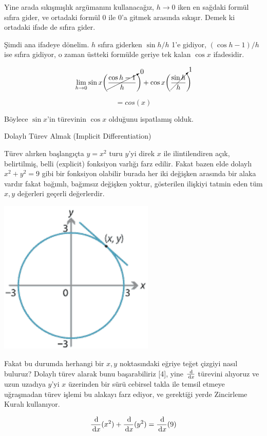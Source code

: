 \documentclass[12pt,fleqn]{article}\usepackage{../../common}
\begin{document}
Yine arada sıkışmışlık argümanını kullanacağız, $h \to 0$ iken en sağdaki
formül sıfıra gider, ve ortadaki formül 0 ile 0'a gitmek arasında
sıkışır. Demek ki ortadaki ifade de sıfıra gider.

Şimdi ana ifadeye dönelim. $h$ sıfıra giderken $\sin h/h$ 1'e gidiyor,
$(\cos h-1)/h$ ise sıfıra gidiyor, o zaman üstteki formülde geriye tek
kalan $\cos x$ ifadesidir. 

$$ \lim_{h \to 0}  
\sin x \bigg( \cancelto{0}{\frac{\cos h - 1}{h}} \bigg) + 
\cos x \bigg( \cancelto{1}{\frac{\sin h}{h}} \bigg)
$$

$$ = cos(x) $$

Böylece $\sin x$'in türevinin $\cos x$ olduğunu ispatlamış olduk.

Dolaylı Türev Almak (Implicit Differentiation)

Türev alırken başlangıçta $y = x^2$ turu $y$'yi direk $x$ ile ilintilendiren
açık, belirtilmiş, belli (explicit) fonksiyon varlığı farz edilir. Fakat bazen
elde dolaylı $x^2+y^2 = 9$ gibi bir fonksiyon olabilir burada her iki değişken
arasında bir alaka vardır fakat bağımlı, bağımsız değişken yoktur, gösterilen
ilişkiyi tatmin eden tüm $x,y$ değerleri geçerli değerlerdir. 

\includegraphics[width=20em]{ode_mattuck_93_diff_03.png}

Fakat bu durumda herhangi bir $x,y$ noktasındaki eğriye teğet çizgiyi nasıl
buluruz? Dolaylı türev alarak bunu başarabiliriz [4], yine $\frac{\,\mathrm{d}}{\,\mathrm{d} x}$
türevini alıyoruz ve uzun uzadıya $y$'yi $x$ üzerinden bir sürü cebirsel takla
ile temsil etmeye uğraşmadan türev işlemi bu alakayı farz ediyor, ve gerektiği
yerde Zincirleme Kuralı kullanıyor.

$$
\frac{\,\mathrm{d}}{\,\mathrm{d} x} (x^2)  + \frac{\,\mathrm{d}}{\,\mathrm{d} x} (y^2) = \frac{\,\mathrm{d}}{\,\mathrm{d} x} (9)
$$
\end{document}
